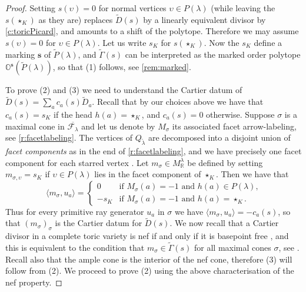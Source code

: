 \documentclass{amsart}
\theoremstyle{definition}
\numberwithin{equation}{section}
\newcommand{\vv}{\upsilon}
\newcommand{\R}{\mathbb R}
\newcommand{\FF}{\mathcal{F}}
\begin{document}
\begin{proof} Setting $s(\vv)=0$ for normal vertices $\vv\in P(\lambda)$ (while leaving the $s(\star_K)$ as they are) replaces $\widetilde D(s)$ by a linearly equivalent divisor by \cref{c:toricPicard}, and 
amounts to a shift of the polytope. Therefore we may assume $s(\vv)=0$ for $\vv\in P(\lambda)$. Let us write $s_K$ for $s(\star_K)$. 
	Now the $s_K$ define a marking $\mathbf s$ of $\widetilde P(\lambda)$, and $\widetilde\Gamma(s)$ can be interpreted as the marked order polytope $\mathbb O^{\mathbf s}(\widetilde P(\lambda))$, so that (1) follows, see   \cref{rem:marked}. 	

	
	
To prove (2) and (3)	we need to understand the Cartier datum of $\widetilde D(s)=\sum_{a}c_a(s)\widetilde D_a$. Recall that by our choices above we have that $c_a(s)=s_K$ if the head $h(a)=\star_K$, and $c_a(s)=0$ otherwise.  Suppose $\sigma$ is a maximal cone in $\overline{\FF_\lambda}$ and let us denote by $M_\sigma$ its associated facet arrow-labeling, see \cref{r:facetlabeling}. The vertices of $Q_{\widetilde\lambda}$ are decomposed into a disjoint union of 
	\textit{facet components} as in the end of \cref{r:facetlabeling}, and we have precisely one facet component  for each starred vertex \cite[Lemma~5.14]{RWReflexive}. Let $m_\sigma\in M^\lambda_{\R}$ be defined 
	by setting  $m_{\sigma,\vv}=s_K$  
	if $\vv\in P(\lambda)$ lies in the facet component of $\star_K$. Then we have that  
	\begin{equation}\label{eq:innerproduct}
\langle m_\sigma,u_a\rangle= \begin{cases}
0 & \text{if $M_\sigma(a)=-1$ and $h(a)\in P(\lambda)$,}\\
-s_K & \text{if $M_\sigma(a)=-1$ and $h(a)=\star_K$.}
\end{cases} 
	\end{equation}
Thus for every primitive ray generator $u_a$ in $\sigma$ we have $\langle m_\sigma,u_a\rangle=-c_a(s)$, so that $(m_\sigma)_\sigma$ is the Cartier datum for $\widetilde D(s)$. 
We now recall that a Cartier divisor in a complete toric variety is nef if and only if it is basepoint free \cite[Theorem 6.3.12]{CLS}, and this is equivalent to the condition that  $m_\sigma\in\widetilde\Gamma(s)$ for all maximal cones $\sigma$, see \cite[Proposition 6.1.1]{CLS}. Recall also that the ample cone is the interior of the nef cone, therefore (3) will follow from (2).
	We proceed to prove (2) using the above  characterisation of the nef property. 


\end{proof}
\end{document}
